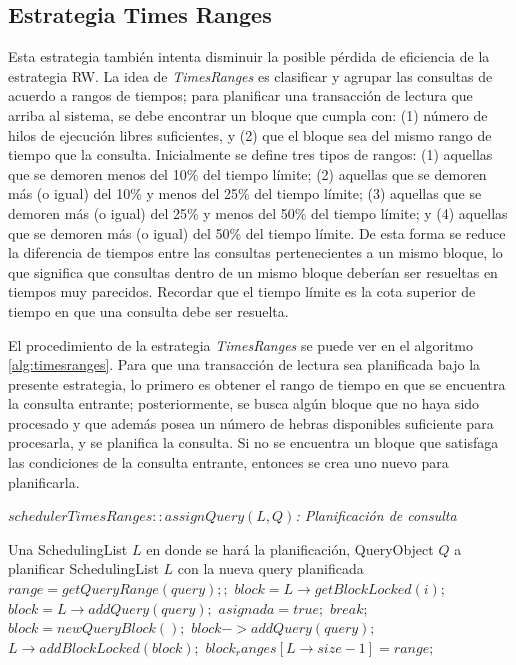 \subsection{Estrategia Times Ranges}
\label{scheduling:timesranges}
Esta estrategia también intenta disminuir la posible pérdida de eficiencia de la estrategia RW. La idea de \textit{TimesRanges} es clasificar y agrupar las consultas de acuerdo a rangos de tiempos; para planificar una transacción de lectura que arriba al sistema, se debe encontrar un bloque que cumpla con: (1) número de hilos de ejecución libres suficientes, y (2) que el bloque sea del mismo rango de tiempo que la consulta. Inicialmente se define tres tipos de rangos: (1) aquellas que se demoren menos del 10\% del tiempo límite; (2) aquellas que se demoren más (o igual) del 10\% y menos del 25\% del tiempo límite; (3) aquellas que se demoren más (o igual) del 25\% y menos del 50\% del tiempo límite; y (4) aquellas que se demoren más (o igual) del 50\% del tiempo límite. De esta forma se reduce la diferencia de tiempos entre las consultas pertenecientes a un mismo bloque, lo que significa que consultas dentro de un mismo bloque deberían ser resueltas en tiempos muy parecidos. Recordar que el tiempo límite es la cota superior de tiempo en que una consulta debe ser resuelta.

El procedimiento de la estrategia \textit{TimesRanges} se puede ver en el algoritmo \ref{alg:timesranges}. Para que una transacción de lectura sea planificada bajo la presente estrategia, lo primero es obtener el rango de tiempo en que se encuentra la consulta entrante; posteriormente, se busca algún bloque que no haya sido procesado y que además posea un número de hebras disponibles suficiente para procesarla, y se planifica la consulta. Si no se encuentra un bloque que satisfaga las condiciones de la consulta entrante, entonces se crea uno nuevo para planificarla. 

\begin{algorithm}[tp]
\caption{\em $schedulerTimesRanges::assignQuery(L, Q)$: Planificación de consulta}
\label{alg:timesranges}
\begin{algorithmic}[1]
\REQUIRE Una SchedulingList $L$ en donde se hará la planificación, QueryObject $Q$ a planificar
\ENSURE SchedulingList $L$ con la nueva query planificada	
	\STATE $range = getQueryRange(query);;$		
		\STATE $block = L \rightarrow getBlockLocked(i);$	
			\STATE $block = L \rightarrow addQuery(query);$
			\STATE $asignada = true;$
			\STATE $break;$	
		\ENDIF
	\ENDFOR
		\STATE $block = new QueryBlock();$	
		\STATE $block->addQuery(query);$	
		\STATE $L \rightarrow addBlockLocked(block);$
		\STATE $block_ranges[L \rightarrow size - 1] = range;$	
	\ENDIF
\end{algorithmic}
\end{algorithm}


